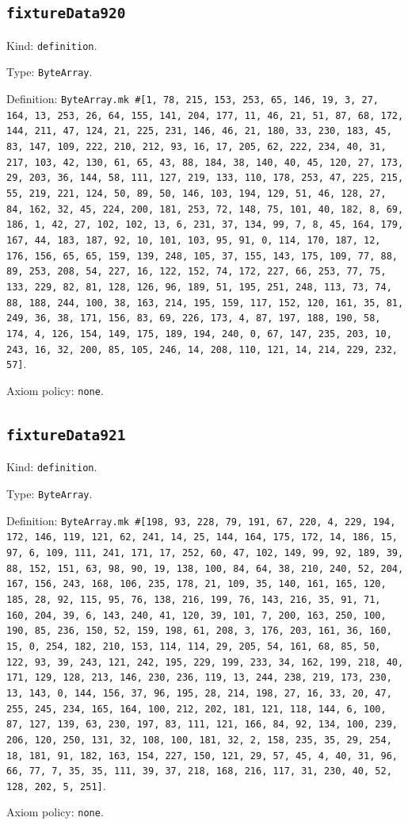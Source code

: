 \documentclass[11pt]{article}
\begin{document}
\subsection*{\texttt{fixtureData920}}
\noindent Kind: \texttt{definition}.\par
\noindent Type: \texttt{ByteArray}.\par
\noindent Definition: \texttt{ByteArray.mk \#[1, 78, 215, 153, 253, 65, 146, 19, 3, 27, 164, 13, 253, 26, 64, 155, 141, 204, 177, 11, 46, 21, 51, 87, 68, 172, 144, 211, 47, 124, 21, 225, 231, 146, 46, 21, 180, 33, 230, 183, 45, 83, 147, 109, 222, 210, 212, 93, 16, 17, 205, 62, 222, 234, 40, 31, 217, 103, 42, 130, 61, 65, 43, 88, 184, 38, 140, 40, 45, 120, 27, 173, 29, 203, 36, 144, 58, 111, 127, 219, 133, 110, 178, 253, 47, 225, 215, 55, 219, 221, 124, 50, 89, 50, 146, 103, 194, 129, 51, 46, 128, 27, 84, 162, 32, 45, 224, 200, 181, 253, 72, 148, 75, 101, 40, 182, 8, 69, 186, 1, 42, 27, 102, 102, 13, 6, 231, 37, 134, 99, 7, 8, 45, 164, 179, 167, 44, 183, 187, 92, 10, 101, 103, 95, 91, 0, 114, 170, 187, 12, 176, 156, 65, 65, 159, 139, 248, 105, 37, 155, 143, 175, 109, 77, 88, 89, 253, 208, 54, 227, 16, 122, 152, 74, 172, 227, 66, 253, 77, 75, 133, 229, 82, 81, 128, 126, 96, 189, 51, 195, 251, 248, 113, 73, 74, 88, 188, 244, 100, 38, 163, 214, 195, 159, 117, 152, 120, 161, 35, 81, 249, 36, 38, 171, 156, 83, 69, 226, 173, 4, 87, 197, 188, 190, 58, 174, 4, 126, 154, 149, 175, 189, 194, 240, 0, 67, 147, 235, 203, 10, 243, 16, 32, 200, 85, 105, 246, 14, 208, 110, 121, 14, 214, 229, 232, 57]}.\par
\noindent Axiom policy: \texttt{none}.\par
\subsection*{\texttt{fixtureData921}}
\noindent Kind: \texttt{definition}.\par
\noindent Type: \texttt{ByteArray}.\par
\noindent Definition: \texttt{ByteArray.mk \#[198, 93, 228, 79, 191, 67, 220, 4, 229, 194, 172, 146, 119, 121, 62, 241, 14, 25, 144, 164, 175, 172, 14, 186, 15, 97, 6, 109, 111, 241, 171, 17, 252, 60, 47, 102, 149, 99, 92, 189, 39, 88, 152, 151, 63, 98, 90, 19, 138, 100, 84, 64, 38, 210, 240, 52, 204, 167, 156, 243, 168, 106, 235, 178, 21, 109, 35, 140, 161, 165, 120, 185, 28, 92, 115, 95, 76, 138, 216, 199, 76, 143, 216, 35, 91, 71, 160, 204, 39, 6, 143, 240, 41, 120, 39, 101, 7, 200, 163, 250, 100, 190, 85, 236, 150, 52, 159, 198, 61, 208, 3, 176, 203, 161, 36, 160, 15, 0, 254, 182, 210, 153, 114, 114, 29, 205, 54, 161, 68, 85, 50, 122, 93, 39, 243, 121, 242, 195, 229, 199, 233, 34, 162, 199, 218, 40, 171, 129, 128, 213, 146, 230, 236, 119, 13, 244, 238, 219, 173, 230, 13, 143, 0, 144, 156, 37, 96, 195, 28, 214, 198, 27, 16, 33, 20, 47, 255, 245, 234, 165, 164, 100, 212, 202, 181, 121, 118, 144, 6, 100, 87, 127, 139, 63, 230, 197, 83, 111, 121, 166, 84, 92, 134, 100, 239, 206, 120, 250, 131, 32, 108, 100, 181, 32, 2, 158, 235, 35, 29, 254, 18, 181, 91, 182, 163, 154, 227, 150, 121, 29, 57, 45, 4, 40, 31, 96, 66, 77, 7, 35, 35, 111, 39, 37, 218, 168, 216, 117, 31, 230, 40, 52, 128, 202, 5, 251]}.\par
\noindent Axiom policy: \texttt{none}.\par
\end{document}
